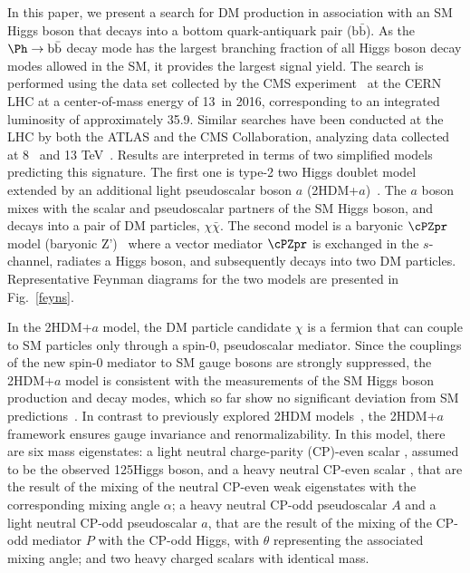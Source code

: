 In this paper, we  present a search for DM production in association
with an SM Higgs boson that decays into a bottom quark-antiquark pair ($\mathrm{b\bar{b}}$). As the $\Ph\rightarrow \mathrm{b\bar{b}}$ decay mode has the largest branching fraction of all Higgs boson decay modes allowed in the SM, it provides the largest signal yield. The search is performed using the data set collected by the CMS experiment~\cite{CMSdetector} at the CERN LHC at a center-of-mass energy of 13\TeV~in 2016, corresponding to an integrated luminosity of approximately 35.9\fbinv. 
Similar searches have been conducted at the LHC by both the ATLAS and the CMS Collaboration, analyzing data collected at 8~\cite{PhysRevLett.115.131801} and 13 TeV~\cite{PhysRevLett.119.181804,1807.02826}.
Results are interpreted in terms of two simplified models predicting this signature. The first one is type-2 two Higgs doublet model extended by an additional light pseudoscalar boson $a$ (2HDM+$a$)~\cite{Bauer2017}. The $a$ boson mixes with the scalar and pseudoscalar partners of the SM Higgs boson, and decays into a pair of DM particles,  $\chi\bar{\chi}$. The second model is a baryonic $\cPZpr$ model (baryonic Z')~\cite{PhysRevD.89.075017} where a vector mediator $\cPZpr$ is exchanged in the $s$-channel, radiates a Higgs boson, and subsequently decays into two DM 
particles. Representative Feynman diagrams for the two models are presented in Fig.~\ref{feyns}.


In the 2HDM+$a$ model, the DM particle candidate $\chi$ is a fermion that can couple to SM particles only through a spin-0, pseudoscalar mediator. Since the couplings of the new spin-0
mediator to SM gauge bosons are strongly suppressed, the 2HDM+$a$ model
is consistent with the measurements of the SM Higgs boson production and
decay modes, which so far show no significant deviation from SM predictions~\cite{Khachatryan:2016vau}. In contrast to previously explored 2HDM models~\cite{2HDM,Aaboud:2017yqz,Sirunyan:2017hnk}, the 2HDM+$a$ framework ensures gauge invariance and renormalizability. In this model, there are six mass eigenstates:
a light neutral charge-parity (CP)-even scalar \Ph, assumed to be the
observed 125\GeV Higgs boson, and a heavy neutral CP-even scalar \PH, that are the result of the mixing of the neutral CP-even weak eigenstates with the corresponding mixing angle $\alpha$;
a heavy neutral CP-odd pseudoscalar $A$ and a light neutral CP-odd pseudoscalar $a$, that are the result of the mixing of the CP-odd mediator $P$ with the CP-odd Higgs, with $\theta$ representing the associated mixing angle; and two heavy charged scalars \Hpm with identical mass. 

